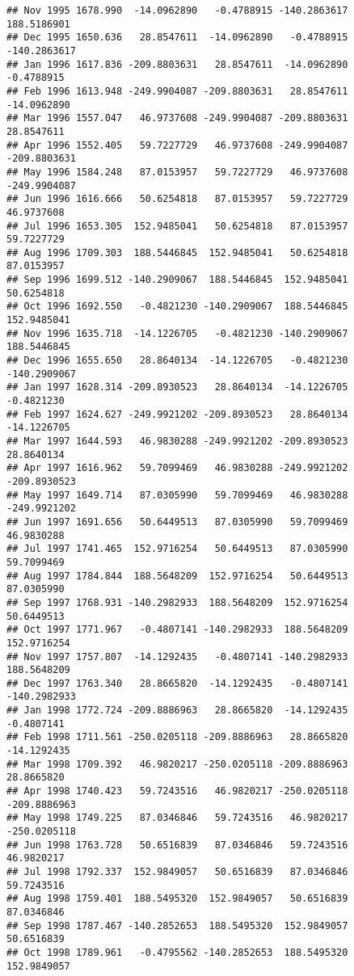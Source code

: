\documentclass[]{article}
\begin{document}
\begin{verbatim}
## Nov 1995 1678.990  -14.0962890   -0.4788915 -140.2863617  188.5186901
## Dec 1995 1650.636   28.8547611  -14.0962890   -0.4788915 -140.2863617
## Jan 1996 1617.836 -209.8803631   28.8547611  -14.0962890   -0.4788915
## Feb 1996 1613.948 -249.9904087 -209.8803631   28.8547611  -14.0962890
## Mar 1996 1557.047   46.9737608 -249.9904087 -209.8803631   28.8547611
## Apr 1996 1552.405   59.7227729   46.9737608 -249.9904087 -209.8803631
## May 1996 1584.248   87.0153957   59.7227729   46.9737608 -249.9904087
## Jun 1996 1616.666   50.6254818   87.0153957   59.7227729   46.9737608
## Jul 1996 1653.305  152.9485041   50.6254818   87.0153957   59.7227729
## Aug 1996 1709.303  188.5446845  152.9485041   50.6254818   87.0153957
## Sep 1996 1699.512 -140.2909067  188.5446845  152.9485041   50.6254818
## Oct 1996 1692.550   -0.4821230 -140.2909067  188.5446845  152.9485041
## Nov 1996 1635.718  -14.1226705   -0.4821230 -140.2909067  188.5446845
## Dec 1996 1655.650   28.8640134  -14.1226705   -0.4821230 -140.2909067
## Jan 1997 1628.314 -209.8930523   28.8640134  -14.1226705   -0.4821230
## Feb 1997 1624.627 -249.9921202 -209.8930523   28.8640134  -14.1226705
## Mar 1997 1644.593   46.9830288 -249.9921202 -209.8930523   28.8640134
## Apr 1997 1616.962   59.7099469   46.9830288 -249.9921202 -209.8930523
## May 1997 1649.714   87.0305990   59.7099469   46.9830288 -249.9921202
## Jun 1997 1691.656   50.6449513   87.0305990   59.7099469   46.9830288
## Jul 1997 1741.465  152.9716254   50.6449513   87.0305990   59.7099469
## Aug 1997 1784.844  188.5648209  152.9716254   50.6449513   87.0305990
## Sep 1997 1768.931 -140.2982933  188.5648209  152.9716254   50.6449513
## Oct 1997 1771.967   -0.4807141 -140.2982933  188.5648209  152.9716254
## Nov 1997 1757.807  -14.1292435   -0.4807141 -140.2982933  188.5648209
## Dec 1997 1763.340   28.8665820  -14.1292435   -0.4807141 -140.2982933
## Jan 1998 1772.724 -209.8886963   28.8665820  -14.1292435   -0.4807141
## Feb 1998 1711.561 -250.0205118 -209.8886963   28.8665820  -14.1292435
## Mar 1998 1709.392   46.9820217 -250.0205118 -209.8886963   28.8665820
## Apr 1998 1740.423   59.7243516   46.9820217 -250.0205118 -209.8886963
## May 1998 1749.225   87.0346846   59.7243516   46.9820217 -250.0205118
## Jun 1998 1763.728   50.6516839   87.0346846   59.7243516   46.9820217
## Jul 1998 1792.337  152.9849057   50.6516839   87.0346846   59.7243516
## Aug 1998 1759.401  188.5495320  152.9849057   50.6516839   87.0346846
## Sep 1998 1787.467 -140.2852653  188.5495320  152.9849057   50.6516839
## Oct 1998 1789.961   -0.4795562 -140.2852653  188.5495320  152.9849057

\end{verbatim}
\end{document}
